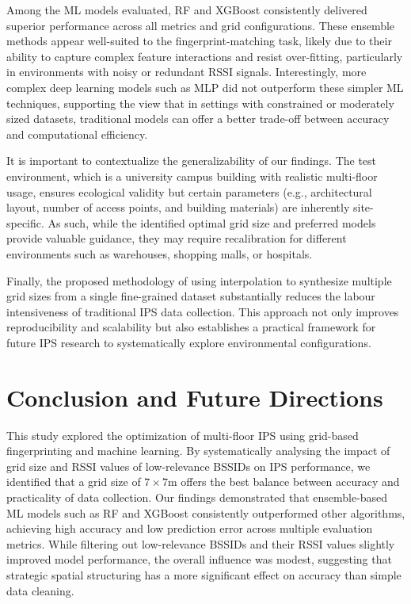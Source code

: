 \documentclass[runningheads]{llncs}
\begin{document}
Among the ML models evaluated, RF and XGBoost consistently delivered superior performance across all metrics and grid configurations. These ensemble methods appear well-suited to the fingerprint-matching task, likely due to their ability to capture complex feature interactions and resist over-fitting, particularly in environments with noisy or redundant RSSI signals. Interestingly, more complex deep learning models such as MLP did not outperform these simpler ML techniques, supporting the view that in settings with constrained or moderately sized datasets, traditional models can offer a better trade-off between accuracy and computational efficiency.

It is important to contextualize the generalizability of our findings. The test environment, which is a university campus building with realistic multi-floor usage, ensures ecological validity but certain parameters (e.g., architectural layout, number of access points, and building materials) are inherently site-specific. As such, while the identified optimal grid size and preferred models provide valuable guidance, they may require recalibration for different environments such as warehouses, shopping malls, or hospitals.

Finally, the proposed methodology of using interpolation to synthesize multiple grid sizes from a single fine-grained dataset substantially reduces the labour intensiveness of traditional IPS data collection. This approach not only improves reproducibility and scalability but also establishes a practical framework for future IPS research to systematically explore environmental configurations.

\section{Conclusion and Future Directions}\label{sec:conclusion}

This study explored the optimization of multi-floor IPS using grid-based fingerprinting and machine learning. By systematically analysing the impact of grid size and RSSI values of low-relevance BSSIDs on IPS performance, we identified that a grid size of $7\times7$m offers the best balance between accuracy and practicality of data collection. Our findings demonstrated that ensemble-based ML models such as RF and XGBoost consistently outperformed other algorithms, achieving high accuracy and low prediction error across multiple evaluation metrics. While filtering out low-relevance BSSIDs and their RSSI values slightly improved model performance, the overall influence was modest, suggesting that strategic spatial structuring has a more significant effect on accuracy than simple data cleaning.
\end{document}
